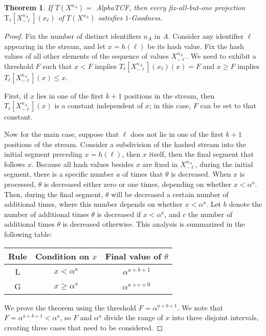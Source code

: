 \documentclass{article}
\newcommand{\xnml}{X^{n_A}_{-\ell}}
\newcommand{\txn}{\mathrm{T_\ell}[X^{n_A}_{-\ell}](x_\ell)}
\newcommand{\edit}[1]{{#1}}
\newtheorem{theorem}{Theorem}[section]
\begin{document}
\begin{theorem}\label{thm:alpha-sat}
If $T(X^{n_A}) = $ AlphaTCF, then every fix-all-but-one projection $\txn$ of $T(X^{n_A})$ satisfies $1$-Goodness.
\end{theorem}
\begin{proof}
Fix the number of distinct identifiers $n_A$ in $A$. Consider any identifier $\ell$ appearing in the stream,
and let $x=h(\ell)$ be its hash value. Fix the hash values of all other elements of the sequence of values $\xnml$.
We need to exhibit a threshold $F$ such that $x < F$ implies $T_\ell[\xnml](x_\ell)(x) = F$ and $x \ge F$ implies $T_\ell[\xnml](x) \le x$.

First, if $x$ lies in one of the first $k+1$ positions in the stream, then $T_\ell[\xnml](x)$ is a constant independent of $x$; in
this case, $F$ can be set to that constant.






Now for the main case, suppose that $\ell$ does not lie in one of the first $k+1$ positions of the stream.
Consider a subdivision of the hashed stream into the initial segment preceding $x=h(\ell)$, 
then $x$ itself, then the final segment that follows $x$. Because all hash values besides $x$ are fixed in $\xnml$,
during the initial segment, there is a specific number $a$ of times that 
$\theta$ is decreased. When $x$ is processed, $\theta$ is decreased either zero or one times,
depending on whether $x < \alpha^a$.
Then, during the final segment, $\theta$ will be decreased a certain number of additional times, where 
this number depends on whether $x < \alpha^a$. Let $b$ denote the number of additional times $\theta$
is decreased if $x < \alpha^a$, and $c$ the number of additional times $\theta$ is decreased otherwise.
This analysis is summarized in the following table:

\begin{center}
\begin{tabular}{|c|c|c|}
\hline
Rule & Condition on $x$ & Final value of $\theta$ \\
\hline
\edit{L} & $x < \alpha^a$ & $\alpha^{a + b + 1}$ \\
\hline
\edit{G} & $x \ge \alpha^a$ & $\alpha^{a + c + 0}$ \\
\hline
\end{tabular}
\end{center}


We prove the theorem using the threshold $F = \alpha^{a + b + 1}$. We note that
$F = \alpha^{a + b + 1} < \alpha^a$, so $F$ and $\alpha^a$ divide the range of $x$
into three disjoint intervals, creating three cases that need to be considered.


\end{proof}
\end{document}
